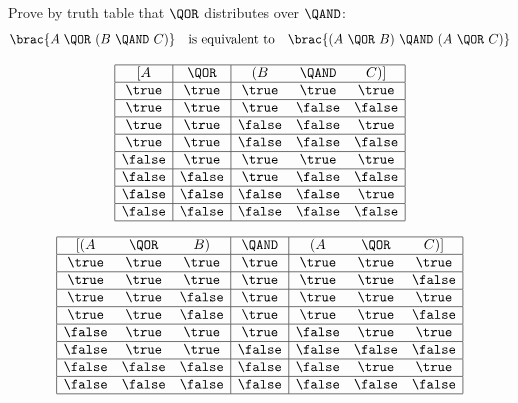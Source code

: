 \documentclass[handout]{mcs}
\begin{document}


\begin{problem}
Prove by truth table that $\QOR$ distributes over $\QAND$:
\begin{equation}\label{dist}
\brac{A \; \QOR\ (B\ \QAND\ C)} \quad\text{is equivalent to}\quad
\brac{(A\ \QOR\ B)\ \QAND\ (A\ \QOR\ C)}
\end{equation}

\begin{solution}

\[
\begin{array}{|c|c|ccc|}
\hline
\text{[}A      & \QOR  & \text{(}B    & \QAND & C\text{)]}   \\ \hline
\true  &\true       & \true  & \true      & \true \\ \hline
\true  &\true       & \true  & \false     & \false\\ \hline
\true  &\true       & \false & \false     & \true \\ \hline
\true  &\true       & \false & \false     & \false\\ \hline
\false &\true       & \true  & \true      & \true \\ \hline
\false &\false      & \true  & \false     & \false\\ \hline
\false &\false      & \false & \false     & \true \\ \hline
\false &\false      & \false & \false     & \false\\ \hline
\end{array}
\]

\[
\begin{array}{|ccc|c|ccc|}
\hline
\text{[(}A  & \QOR      & B\text{)} & \QAND       & \text{(}A & \QOR      & C\text{)]} \\  \hline
     \true  & \true     & \true     & \true      &   \true   & \true     & \true \\  \hline
     \true  & \true     & \true     & \true      &   \true   & \true     & \false\\  \hline
     \true  & \true     & \false    & \true      &   \true   & \true     & \true \\  \hline
     \true  & \true     & \false    & \true      &   \true   & \true     & \false\\  \hline
     \false & \true     & \true     & \true      &   \false  & \true     & \true \\  \hline
     \false & \true     & \true     & \false     &   \false  & \false    & \false\\  \hline
     \false & \false    & \false    & \false     &   \false  & \true     & \true \\  \hline
     \false & \false    & \false    & \false     &   \false  & \false    & \false\\  \hline
\end{array}
\]

\end{solution}


\end{problem}
\end{document}
